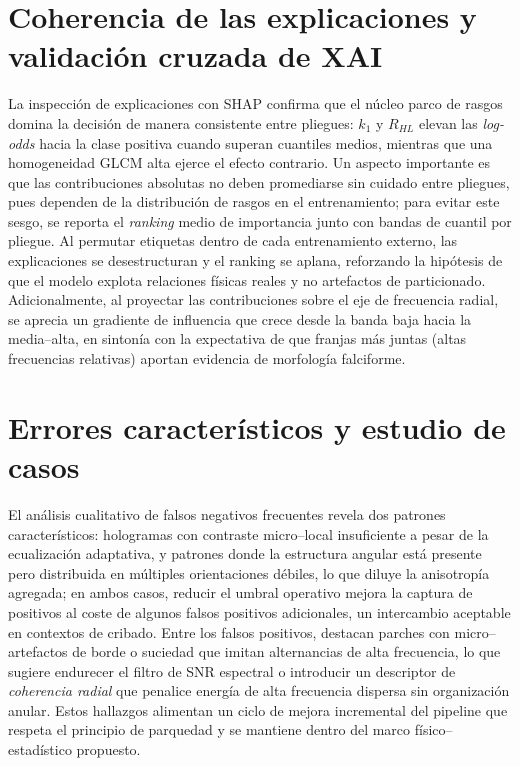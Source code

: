 \section*{Coherencia de las explicaciones y validación cruzada de XAI}
La inspección de explicaciones con SHAP confirma que el núcleo parco de rasgos domina la decisión de manera consistente entre pliegues: $k_1$ y $R_{HL}$ elevan las \emph{log-odds} hacia la clase positiva cuando superan cuantiles medios, mientras que una homogeneidad GLCM alta ejerce el efecto contrario. Un aspecto importante es que las contribuciones absolutas no deben promediarse sin cuidado entre pliegues, pues dependen de la distribución de rasgos en el entrenamiento; para evitar este sesgo, se reporta el \emph{ranking} medio de importancia junto con bandas de cuantil por pliegue. Al permutar etiquetas dentro de cada entrenamiento externo, las explicaciones se desestructuran y el ranking se aplana, reforzando la hipótesis de que el modelo explota relaciones físicas reales y no artefactos de particionado. Adicionalmente, al proyectar las contribuciones sobre el eje de frecuencia radial, se aprecia un gradiente de influencia que crece desde la banda baja hacia la media–alta, en sintonía con la expectativa de que franjas más juntas (altas frecuencias relativas) aportan evidencia de morfología falciforme.

\section*{Errores característicos y estudio de casos}
El análisis cualitativo de falsos negativos frecuentes revela dos patrones característicos: hologramas con contraste micro–local insuficiente a pesar de la ecualización adaptativa, y patrones donde la estructura angular está presente pero distribuida en múltiples orientaciones débiles, lo que diluye la anisotropía agregada; en ambos casos, reducir el umbral operativo mejora la captura de positivos al coste de algunos falsos positivos adicionales, un intercambio aceptable en contextos de cribado. Entre los falsos positivos, destacan parches con micro–artefactos de borde o suciedad que imitan alternancias de alta frecuencia, lo que sugiere endurecer el filtro de SNR espectral o introducir un descriptor de \emph{coherencia radial} que penalice energía de alta frecuencia dispersa sin organización anular. Estos hallazgos alimentan un ciclo de mejora incremental del pipeline que respeta el principio de parquedad y se mantiene dentro del marco físico–estadístico propuesto.

